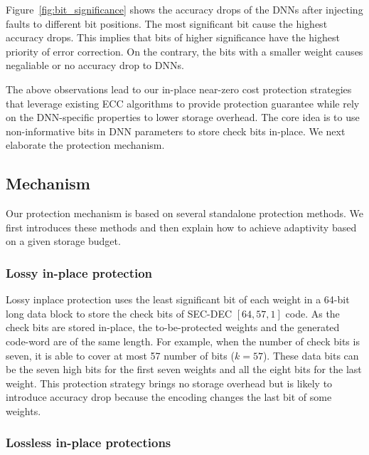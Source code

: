 \documentclass{article}
\begin{document}
Figure~\ref{fig:bit_significance} shows the accuracy drops of the DNNs after injecting faults to different bit positions. The most significant bit cause the highest accuracy drops. This implies that bits of higher significance have the highest priority of error correction. On the contrary, the bits with a smaller weight causes negaliable or no accuracy drop to DNNs. 

The above observations lead to our in-place near-zero cost protection strategies that leverage existing ECC algorithms to provide protection guarantee while rely on the DNN-specific properties to lower storage overhead. The core idea is to use non-informative bits in DNN parameters to store check bits in-place. We next elaborate the protection mechanism. 

\subsection{Mechanism}
Our protection mechanism is based on several standalone protection methods. We first introduces these methods and then explain how to achieve adaptivity based on a given storage budget.  

\subsubsection{Lossy in-place protection}
Lossy inplace protection uses the least significant bit of each weight in a 64-bit long data block to store the check bits of SEC-DEC $[64, 57, 1]$ code. As the check bits are stored in-place, the to-be-protected weights and the generated code-word are of the same length. For example, when the number of check bits is seven, it is able to cover at most 57 number of bits ($k = 57$). These data bits can be the seven high bits for the first seven weights and all the eight bits for the last weight. 
This protection strategy brings no storage overhead but is likely to introduce accuracy drop because the encoding changes the last bit of some weights. 


\subsubsection{Lossless in-place protections}
\end{document}
